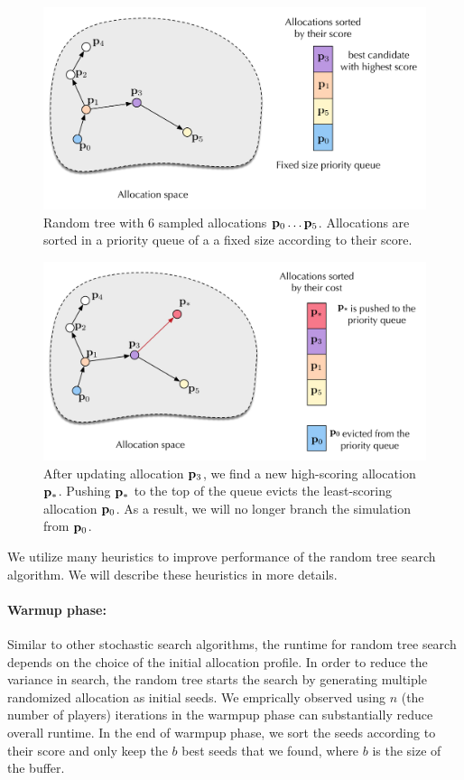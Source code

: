 \begin{figure}[htb]
\begin{center}
\includegraphics[width=.4\textwidth]{random-tree-figure-1}
\end{center}
\caption{Random tree with 6 sampled allocations ${\bf p}_0\dots {\bf p}_5$. Allocations are sorted in a priority queue of a a fixed size according to their score.}
\label{fig:random_tree_1}
\end{figure}

\begin{figure}[htb]
\begin{center}
\includegraphics[width=.4\textwidth]{random-tree-figure-2}
\end{center}
\caption{After updating allocation ${\bf p}_3$, we find a new high-scoring allocation ${\bf p}_*$. Pushing ${\bf p}_*$ to the top of the queue evicts the least-scoring allocation ${\bf p}_0$. As a result, we will no longer branch the simulation from ${\bf p}_0$. }
\label{fig:random_tree_2}
\end{figure}

We utilize many heuristics to improve performance of the random tree search algorithm. We will describe these heuristics in more details.

\paragraph{Warmup phase:} Similar to other stochastic search algorithms, the runtime for random tree search depends on the choice of the initial allocation profile. In order to reduce the variance in search, the random tree starts the search by generating multiple randomized allocation as initial seeds. We emprically observed using $n$ (the number of players) iterations in the warmpup phase can substantially reduce overall runtime. In the end of warmpup phase, we sort the seeds according to their score and only keep the $b$ best seeds that we found, where $b$ is the size of the buffer.

